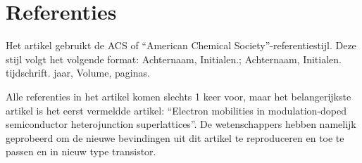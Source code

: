 \documentclass[11pt]{article}
\begin{document}
\section{Referenties}
Het artikel gebruikt de ACS of ``American Chemical Society''-referentiestijl. Deze stijl volgt het volgende format: Achternaam, Initialen.; Achternaam, Initialen. tijdschrift. jaar, Volume, paginas. 

Alle referenties in het artikel komen slechts 1 keer voor, maar het belangerijkste artikel is het eerst vermeldde artikel: ``Electron mobilities in modulation-doped semiconductor heterojunction superlattices''. De wetenschappers hebben namelijk geprobeerd om de nieuwe bevindingen uit dit artikel te reproduceren en toe te passen en in nieuw type transistor.

\appendix




\end{document}
